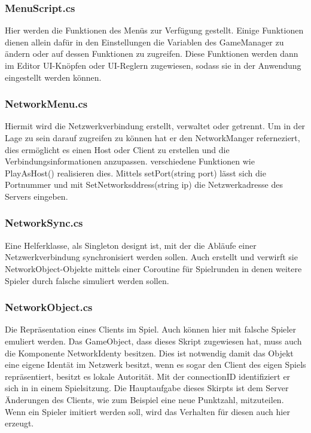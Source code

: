 \subsubsection{MenuScript.cs}
Hier werden die Funktionen des Menüs zur Verfügung gestellt. Einige Funktionen dienen allein dafür in den Einstellungen die Variablen des GameManager zu ändern oder auf dessen Funktionen zu zugreifen. Diese Funktionen werden dann im Editor UI-Knöpfen oder  UI-Reglern zugewiesen, sodass sie in der Anwendung eingestellt werden können.

\subsubsection{NetworkMenu.cs}
Hiermit wird die Netzwerkverbindung erstellt, verwaltet oder getrennt. Um in der Lage zu sein darauf zugreifen zu können hat er den NetworkManger referneziert, dies ermöglicht es einen Host oder Client zu erstellen und die Verbindungsinformationen anzupassen. verschiedene Funktionen wie PlayAsHost() realisieren dies. Mittels setPort(string port) lässt sich die Portnummer und mit SetNetworksddress(string ip) die Netzwerkadresse des Servers eingeben.

\subsubsection{NetworkSync.cs}
Eine Helferklasse, als Singleton designt ist, mit der die Abläufe einer Netzwerkverbindung synchronisiert werden sollen. 
Auch  erstellt und  verwirft sie NetworkObject-Objekte mittels einer Coroutine für Spielrunden in denen weitere Spieler durch falsche simuliert werden sollen.

\subsubsection{NetworkObject.cs}
Die Repräsentation eines Clients im Spiel. Auch können hier mit falsche Spieler emuliert werden. Das GameObject, dass dieses Skript zugewiesen hat, muss auch die  Komponente NetworkIdenty besitzen. Dies ist notwendig damit das Objekt eine eigene Identät im Netzwerk besitzt, wenn es sogar den Client des eigen Spiels repräsentiert, besitzt es lokale Autorität. Mit der connectionID identifiziert er sich in in einem Spielsitzung. Die Hauptaufgabe dieses Skirpts ist dem Server Änderungen des Clients, wie zum Beispiel eine neue Punktzahl, mitzuteilen. Wenn ein Spieler imitiert werden soll, wird das Verhalten für diesen auch hier erzeugt.

